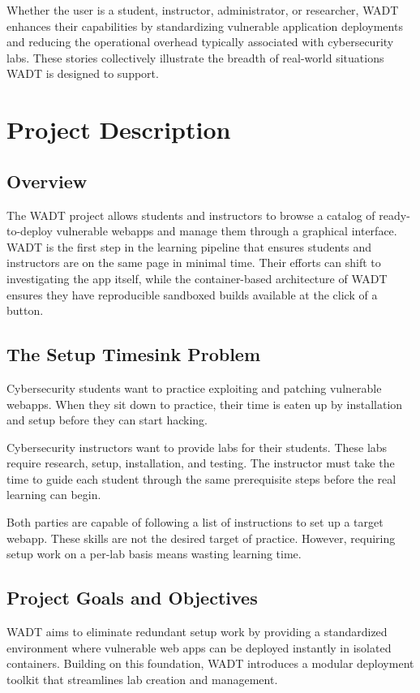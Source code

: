 \documentclass[12pt,titlepage]{article}
\begin{document}
Whether the user is a student, instructor, administrator, or researcher, WADT enhances their capabilities by standardizing vulnerable application deployments and reducing the operational overhead typically associated with cybersecurity labs. These stories collectively illustrate the breadth of real-world situations WADT is designed to support.

\section{Project Description}

\subsection {Overview}
The WADT project allows students and instructors to browse a catalog of ready-to-deploy vulnerable webapps and manage them through a graphical interface. WADT is the first step in the learning pipeline that ensures students and instructors are on the same page in minimal time. Their efforts can shift to investigating the app itself, while the container-based architecture of WADT ensures they have reproducible sandboxed builds available at the click of a button.

\subsection{The Setup Timesink Problem}
Cybersecurity students want to practice exploiting and patching vulnerable webapps. When they sit down to practice, their time is eaten up by installation and setup before they can start hacking.

Cybersecurity instructors want to provide labs for their students. These labs require research, setup, installation, and testing. The instructor must take the time to guide each student through the same prerequisite steps before the real learning can begin.

Both parties are capable of following a list of instructions to set up a target webapp. These skills are not the desired target of practice. However, requiring setup work on a per-lab basis means wasting learning time.

\subsection{Project Goals and Objectives}
WADT aims to eliminate redundant setup work by providing a standardized environment where vulnerable web apps can be deployed instantly in isolated containers. Building on this foundation, WADT introduces a modular deployment toolkit that streamlines lab creation and management.
\end{document}
